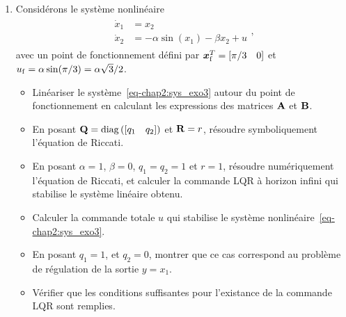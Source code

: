 \begin{enumerate}
	\item 	Considérons le système nonlinéaire 
	\begin{align}\label{eq-chap2:sys_exo3}
		\begin{split}
			\dot{x}_1 &= x_2 \\
			\dot{x}_2 &= -\alpha \sin(x_1)-\beta x_2 +u
		\end{split},
	\end{align} avec un point de fonctionnement défini par $\bm{x}_{\rm f}^T = \left[{\pi}/{3} \quad 0\right]$  et $u_{\rm f} = \alpha\sin(\pi/3)=\alpha\sqrt{3}/2$.
	\begin{itemize}
		\item Linéariser le système~\eqref{eq-chap2:sys_exo3} autour du point de fonctionnement en calculant les expressions des matrices $\mathbf{A}$ et $\mathbf{B}$.
		\item En posant $\mathbf{Q}=\operatorname{diag}\left(\left[q_1 \quad q_2\right]\right)$ et $\mathbf{R}=r$, résoudre symboliquement l'équation de Riccati.
		\item En posant $\alpha=1$, $\beta=0$, $q_1=q_2=1$ et $r=1$, résoudre numériquement l'équation de Riccati, et calculer la commande LQR à horizon infini qui stabilise le système linéaire obtenu.
		\item Calculer la commande totale $u$ qui stabilise le système nonlinéaire~\eqref{eq-chap2:sys_exo3}.
		\item En posant $q_1=1$, et $q_2=0$, montrer que ce cas correspond au problème de régulation de la sortie $y=x_1$.
		\item Vérifier que les conditions suffisantes pour l'existance de la commande LQR sont remplies.
	\end{itemize}
\end{enumerate}